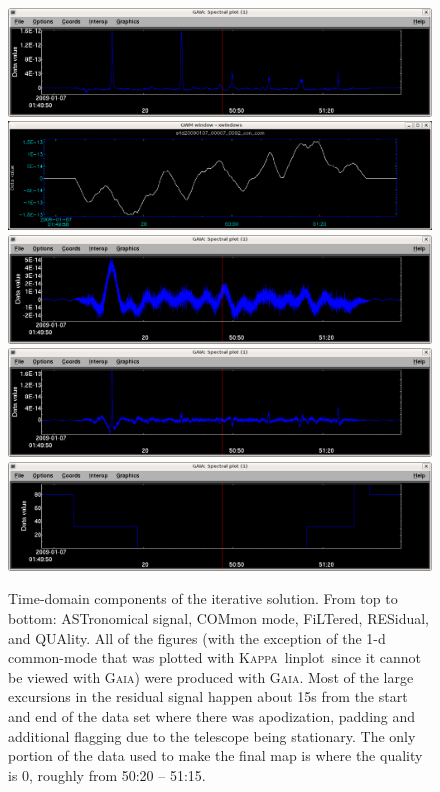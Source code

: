 \documentclass[twoside,11pt]{article}
\newcommand{\Kappa}{\xref{\textsc{Kappa}}{sun95}{}}
\newcommand{\gaia}{\xref{\textsc{Gaia}}{sun214}{}}
\newcommand{\task}[1]{\textsf{#1}}
\newcommand{\linplot}{\xref{\task{linplot}}{sun95}{LINPLOT}}
\newcommand{\xref}[3]{#1}
\renewcommand{\_}{\texttt{\symbol{95}}}
\begin{document}
\begin{figure}
\begin{center}
\includegraphics[width=0.9\linewidth]{iter_ast} \\
\includegraphics[width=0.9\linewidth]{iter_com} \\
\includegraphics[width=0.9\linewidth]{iter_flt} \\
\includegraphics[width=0.9\linewidth]{iter_res} \\
\includegraphics[width=0.9\linewidth]{iter_qua} \\
\caption{Time-domain components of the iterative solution. From top to
  bottom: ASTronomical signal, COMmon mode, FiLTered, RESidual, and
  QUAlity. All of the figures (with the exception of the 1-d
  common-mode that was plotted with \Kappa\ \linplot\ since it cannot
  be viewed with \gaia) were produced with \gaia. Most of the large
  excursions in the residual signal happen about 15s from the start
  and end of the data set where there was apodization, padding and
  additional flagging due to the telescope being stationary. The only
  portion of the data used to make the final map is where the quality
  is 0, roughly from 50:20 -- 51:15.}
\label{fig:itercomp}
\end{center}
\end{figure}
\end{document}
